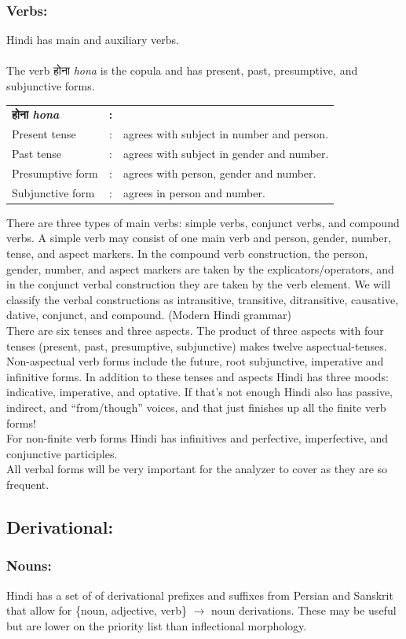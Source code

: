 \documentclass[11pt,letterpaper]{article}
\begin{document}
\subsubsection{Verbs:}
Hindi has main and auxiliary verbs.\\
\\
The verb होना \textit{hona} is the copula and has present, past, presumptive, and subjunctive forms.\\
\begin{tabular}{l c l}
\textbf{होना \textit{hona}} & \textbf{:} &\\
Present tense& : &agrees with subject in number and person.\\
Past tense& : &agrees with subject in gender and number.\\
Presumptive form& : &agrees with person, gender and number.\\
Subjunctive form& : &agrees in person and number.\\
\end{tabular}
There are three types of main verbs: simple verbs, conjunct verbs,
and compound verbs. A simple verb may consist of one main verb
and person, gender, number, tense, and aspect markers. In the
compound verb construction, the person, gender, number, and aspect
markers are taken by the explicators/operators, and in the conjunct
verbal construction they are taken by the verb element. We will
classify the verbal constructions as intransitive, transitive,
ditransitive, causative, dative, conjunct, and compound. (Modern Hindi grammar)\\
There are six tenses and three aspects. The product of three aspects with four tenses (present, past, presumptive, subjunctive) makes twelve aspectual-tenses. Non-aspectual verb forms include the future, root subjunctive, imperative and infinitive forms. In addition to these tenses and aspects Hindi has three moods: indicative, imperative, and optative. If that's not enough Hindi also has passive, indirect, and ``from/though'' voices, and that just finishes up all the finite verb forms!\\
For non-finite verb forms Hindi has infinitives and perfective, imperfective, and conjunctive participles.\\
All verbal forms will be very important for the analyzer to cover as they are so frequent.
\subsection{Derivational:}
\subsubsection{Nouns:}
Hindi has a set of of derivational prefixes and suffixes from Persian and Sanskrit that allow for \{noun, adjective, verb\} $\rightarrow$ noun derivations. These may be useful but are lower on the priority list than inflectional morphology.
\end{document}
